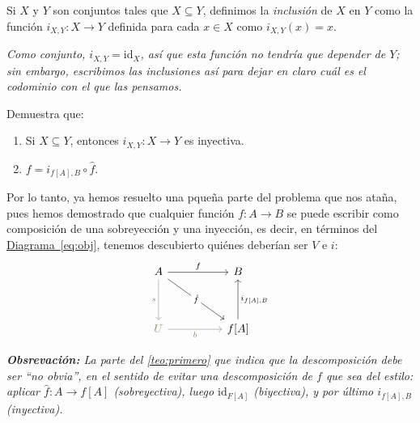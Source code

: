 \documentclass[letterpaper,DIV=14,headsepline,12pt]{scrartcl}
\newcommand{\pts}{}
\newenvironment{ejercicio}[1]{\ifthenelse{\equal{#1}{1} \OR
\equal{#1}{+1}}{\renewcommand{\pts}{\textbf{(#1
pt)}}}{\renewcommand{\pts}{\textbf{(#1 pts)}}}\begin{ejj}\upshape
\pts}{\end{ejj}}
\newcommand{\id}{\mathrm{id}} \newcommand{\op}{{}^{\mathrm{op}}}
\begin{document}
    \begin{definicion}
        Si $X$ y $Y$ son conjuntos tales que $X \subseteq Y$, definimos la
        \textit{inclusión} de $X$ en $Y$ como la función $i_{X,Y}\colon X \to Y$
        definida para cada $x \in X$ como $i_{X,Y}(x) = x$.

        \textit{Como conjunto, $i_{X,Y}=\id_X$, así que esta función no tendría
        que depender de $Y$; sin embargo, escribimos las inclusiones así para
        dejar en claro cuál es el codominio con el que las pensamos.}
    \end{definicion}

    \begin{ejercicio}{1.5}
        Demuestra que:
        \begin{enumerate}
            \item Si $X \subseteq Y$, entonces $i_{X,Y}\colon X \to Y$ es inyectiva.
            \item $f=i_{f[A],B} \circ \hat{f}$.
        \end{enumerate}
    \end{ejercicio}

    Por lo tanto, ya hemos resuelto una pqueña parte del problema que nos ataña,
    pues hemos demostrado que cualquier función $f\colon A \to B$ se puede escribir
    como composición de una sobreyección y una inyección, es decir, en términos
    del \hyperref[eq:obj]{Diagrama~\ref*{eq:obj}}, tenemos descubierto quiénes
    deberían ser $V$ e $i$:
    \begin{equation}\label{eq:hat}
        \begin{tikzcd}
            A && B \\
            \\
            \textcolor{Cornsilk4}{U} && {f[A]}
            \arrow["f", from=1-1, to=1-3]
            \arrow["s"', from=1-1, to=3-1, draw=Cornsilk4, text=Cornsilk4]
            \arrow["{\hat{f}}"{description}, from=1-1, to=3-3]
            \arrow["b"', from=3-1, to=3-3, draw=Cornsilk4, text=Cornsilk4]
            \arrow["{i_{f[A],B}}"', from=3-3, to=1-3]
        \end{tikzcd}
    \end{equation}

    \textit{\textbf{Obsrevación:} La parte del \autoref{teo:primero} que indica que la descomposición
    debe ser ``no obvia'', en el sentido de evitar una descomposición de $f$ que sea del estilo: aplicar
    $\hat{f}:A \to f[A]$ (sobreyectiva), luego $\id_{F[A]}$ (biyectiva), y por último $i_{f[A],B}$ (inyectiva).}
\end{document}
